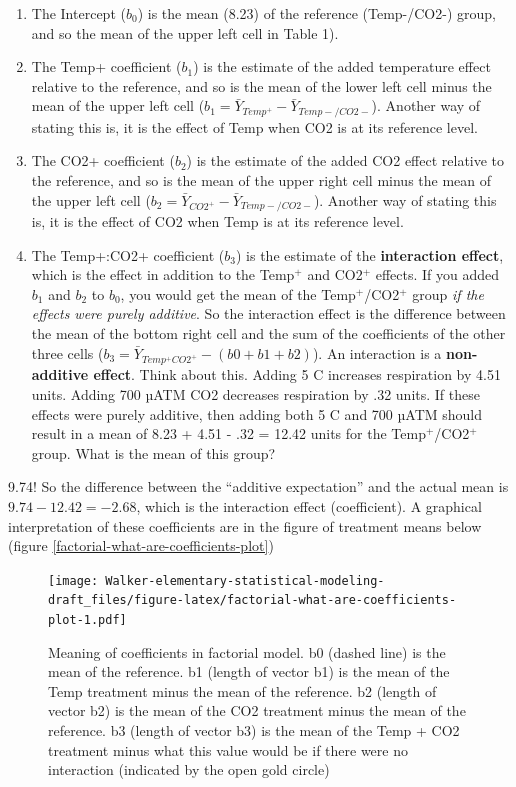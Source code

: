 \documentclass[]{book}
\providecommand{\tightlist}{%
  \setlength{\itemsep}{0pt}\setlength{\parskip}{0pt}}
\begin{document}
\begin{enumerate}
\def\labelenumi{\arabic{enumi}.}
\tightlist
\item
  The Intercept (\(b_0\)) is the mean (8.23) of the reference
  (Temp-/CO2-) group, and so the mean of the upper left cell in Table
  1).
\item
  The Temp+ coefficient (\(b_1\)) is the estimate of the added
  temperature effect relative to the reference, and so is the mean of
  the lower left cell minus the mean of the upper left cell
  (\(b_1=\bar{Y}_{Temp^+}-\bar{Y}_{Temp-/CO2-}\)). Another way of
  stating this is, it is the effect of Temp when CO2 is at its reference
  level.
\item
  The CO2+ coefficient (\(b_2\)) is the estimate of the added CO2 effect
  relative to the reference, and so is the mean of the upper right cell
  minus the mean of the upper left cell
  (\(b_2=\bar{Y}_{CO2^+}-\bar{Y}_{Temp-/CO2-}\)). Another way of stating
  this is, it is the effect of CO2 when Temp is at its reference level.
\item
  The Temp+:CO2+ coefficient (\(b_3\)) is the estimate of the
  \textbf{interaction effect}, which is the effect in addition to the
  Temp\(^+\) and CO2\(^+\) effects. If you added \(b_1\) and \(b_2\) to
  \(b_0\), you would get the mean of the Temp\(^+\)/CO2\(^+\) group
  \emph{if the effects were purely additive}. So the interaction effect
  is the difference between the mean of the bottom right cell and the
  sum of the coefficients of the other three cells
  (\(b_3 = \bar{Y}_{Temp^+CO2^+} - (b0 + b1 + b2)\)). An interaction is
  a \textbf{non-additive effect}. Think about this. Adding 5 C increases
  respiration by 4.51 units. Adding 700 µATM CO2 decreases respiration
  by .32 units. If these effects were purely additive, then adding both
  5 C and 700 µATM should result in a mean of 8.23 + 4.51 - .32 = 12.42
  units for the Temp\(^+\)/CO2\(^+\) group. What is the mean of this
  group?
\end{enumerate}

9.74! So the difference between the ``additive expectation'' and the
actual mean is \(9.74 - 12.42 = -2.68\), which is the interaction effect
(coefficient). A graphical interpretation of these coefficients are in
the figure of treatment means below (figure
\ref{factorial-what-are-coefficients-plot})

\begin{figure}
\centering
\texttt{[image: Walker-elementary-statistical-modeling-draft\_files/figure-latex/factorial-what-are-coefficients-plot-1.pdf]}
\caption{\label{fig:factorial-what-are-coefficients-plot}Meaning of
coefficients in factorial model. b0 (dashed line) is the mean of the
reference. b1 (length of vector b1) is the mean of the Temp treatment
minus the mean of the reference. b2 (length of vector b2) is the mean of
the CO2 treatment minus the mean of the reference. b3 (length of vector
b3) is the mean of the Temp + CO2 treatment minus what this value would
be if there were no interaction (indicated by the open gold circle)}
\end{figure}
\end{document}
